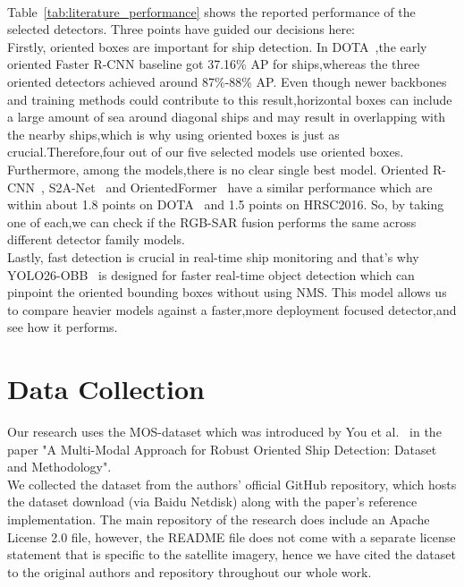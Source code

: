 \\
Table~\ref{tab:literature_performance} shows the reported performance of the selected detectors. Three points have guided our decisions here:\\
Firstly, oriented boxes are important for ship detection. In DOTA~\cite{xia2018dota},the early oriented Faster R-CNN baseline got 37.16\% AP for ships,whereas the three oriented detectors achieved around 87\%-88\% AP. Even though newer backbones and training methods could contribute to this result,horizontal boxes can include a large amount of sea around diagonal ships and may result in overlapping with the nearby ships,which is why using oriented boxes is just as crucial.Therefore,four out of our five selected models use oriented boxes. \\
Furthermore, among the models,there is no clear single best model. Oriented R-CNN~\cite{xie2021oriented}, S2A-Net~\cite{han2021align} and OrientedFormer~\cite{zhao2024orientedformer} have a similar performance which are within about 1.8 points on DOTA~\cite{xia2018dota} and 1.5 points on HRSC2016. So, by taking one of each,we can check if the RGB-SAR fusion performs the same across different detector family models.\\

Lastly, fast detection is crucial in real-time ship monitoring and that’s why YOLO26-OBB~\cite{jocher2026ultralytics} is designed for faster real-time object detection which can pinpoint the oriented bounding boxes without using NMS. This model allows us to compare heavier models against a faster,more deployment focused detector,and see how it performs. 
\\

\section{Data Collection 
} Our research uses the MOS-dataset which was introduced by You et al.~\cite{you2026multi} in the paper "A Multi-Modal Approach for Robust Oriented Ship Detection: Dataset and Methodology". \\
We collected the dataset from the authors' official GitHub repository, which hosts the dataset download (via Baidu Netdisk) along with the paper's reference implementation. The main repository of the research does include an Apache License 2.0 file, however, the README file does not come with a separate license statement that is specific to the satellite imagery, hence we have cited the dataset to the original authors and repository throughout our whole work.
\\

